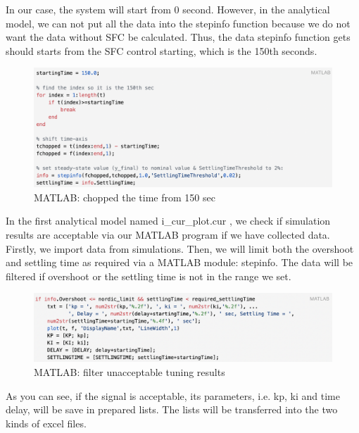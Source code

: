 \documentclass{report}
\begin{document}
In our case, the system will start from 0 second. However, in the analytical model, we can not put all the data into the stepinfo function because we do not want the data without SFC be calculated. Thus, the data stepinfo function gets should starts from the SFC control starting, which is the 150th seconds. \\

\begin{figure}[htbp]
\centering
\includegraphics[width = .999\textwidth]{figure/3_4_2_chopped.png}
\caption{MATLAB: chopped the time from 150 sec}
\label{3_4_2_chopped}
\end{figure}


In the first analytical model named i\_cur\_plot.cur , we check if simulation results are acceptable via our MATLAB program if we have collected data. Firstly, we import data from simulations. Then, we will limit both the overshoot and settling time as required via a MATLAB module: stepinfo. The data will be filtered if overshoot or the settling time is not in the range we set.\\

\begin{figure}[htbp]
\centering
\includegraphics[width = .999\textwidth]{figure/3_4_2_code5.png}
\caption{MATLAB: filter unacceptable tuning results}
\label{3_4_2_code5}
\end{figure}


As you can see, if the signal is acceptable, its parameters, i.e. kp, ki and time delay, will be save in prepared lists. The lists will be transferred into the two kinds of excel files.\\
\end{document}
